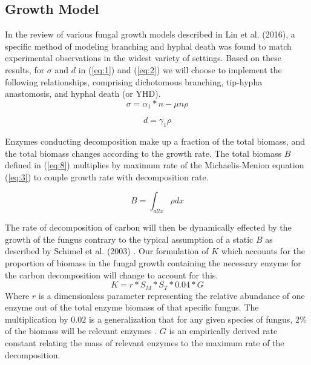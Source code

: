 \documentclass[12pt]{article}
\begin{document}
\begin{multicols}{2}
\subsection{Growth Model}
In the review of various fungal growth models described in Lin et al. (2016), a specific method of modeling branching and hyphal death was found to match experimental observations in the widest variety of settings. Based on these results, for $\sigma$ and $d$ in (\ref{eq:1}) and (\ref{eq:2}) we will choose to implement the following relationships, comprising dichotomous branching, tip-hypha anastomosis, and hyphal death (or YHD). 
\begin{equation} 
\sigma = \alpha_{1}*n - \mu n \rho
\end{equation}

\begin{equation}
d = \gamma_{1}\rho
\end{equation}

Enzymes conducting decomposition make up a fraction of the total biomass, and the total biomass changes according to the growth rate. The total biomass $B$ defined in (\ref{eq:8}) multiplies by maximum rate of the Michaelis-Menion equation (\ref{eq:3}) to couple growth rate with decomposition rate. 

\begin{equation} \label {eq:8}
B = \int_{all x}\rho dx
\end{equation}

The rate of decomposition of carbon will then be dynamically effected by the growth of the fungus contrary to the typical assumption of a static $B$ as described by Schimel et al. (2003) \cite{Schimel2003}. Our formulation of $K$ which accounts for the proportion of biomass in the fungal growth containing the necessary enzyme for the carbon decomposition will change to account for this. 
\begin{equation} \label {eq}
K = r*S_{M}*S_{T}*0.04*G
\end{equation}
Where $r$ is a dimensionless parameter representing the relative abundance of one enzyme out of the total enzyme biomass of that specific fungus. The multiplication by $0.02$ is a generalization that for any given species of fungus, 2\% of the biomass will be relevant enzymes \cite{Moorhead2006}. $G$ is an empirically derived rate constant relating the mass of relevant enzymes to the maximum rate of the decomposition.


\end{multicols}
\end{document}
